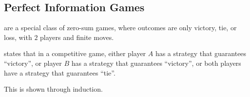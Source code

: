 \subsection{Perfect Information Games}
\begin{definition}
     are a special class of zero-sum games, where outcomes are only victory, tie, or loss, with $2$ players and finite moves.
\end{definition}
\begin{theorem}
     states that in a competitive game, either player $A$ has a strategy that guarantees ``victory'', or player $B$ has a strategy that guarantees ``victory'', or both players have a strategy that guarantees ``tie''.
\end{theorem}
This is shown through induction.

